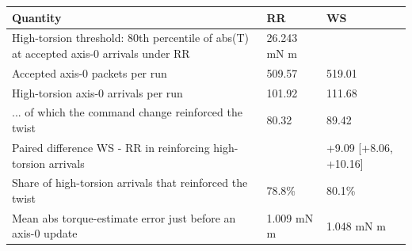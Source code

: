 \begin{tabular}{@{}lll@{}}
\toprule
Quantity & RR & WS \\
\midrule
High-torsion threshold: 80th percentile of abs(T) at accepted axis-0 arrivals under RR & 26.243 mN m &  \\
Accepted axis-0 packets per run & 509.57 & 519.01 \\
High-torsion axis-0 arrivals per run & 101.92 & 111.68 \\
... of which the command change reinforced the twist & 80.32 & 89.42 \\
Paired difference WS - RR in reinforcing high-torsion arrivals &  & +9.09 [+8.06, +10.16] \\
Share of high-torsion arrivals that reinforced the twist & 78.8\% & 80.1\% \\
Mean abs torque-estimate error just before an axis-0 update & 1.009 mN m & 1.048 mN m \\
\bottomrule
\end{tabular}
